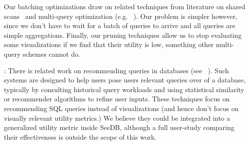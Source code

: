 

 Our batching optimizations
draw on
related techniques from literature on shared
scans~\cite{Fernandez:1994:RBW:191843.191947} and multi-query
optimization (e.g.
~\cite{DBLP:journals/tods/Sellis88}).
Our problem is simpler however, since we don't have 
to wait for a batch of queries to arrive and all queries
are simple aggregations. Finally, our pruning
techniques allow us to stop evaluating some visualizations if we find
that their utility is low, something other multi-query schemes cannot do.

: There is related work on recommending queries in databases (see
~\cite{marcel2011survey}).  Such systems are
 designed to help users pose users relevant
queries over of a database, typically by consulting historical query
workloads and using statistical similarity or recommender algorithms
to refine user inputs.  These techniques focus on recommending SQL queries instead of visualizations
(and hence don't focus on visually relevant utility metrics.)  We
believe they could be integrated into a generalized utility metric
inside SeeDB, although a full user-study comparing their effectiveness
is outside the scope of this work.







